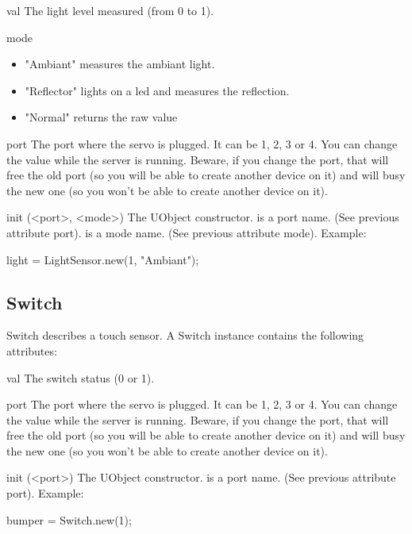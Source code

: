 \begin{urbiscriptapi}

\item[val]
The light level measured (from 0 to 1).

\item[mode]
  \begin{itemize}
  \item "Ambiant" measures the ambiant light.
  \item "Reflector" lights on a led and measures the reflection.
  \item "Normal" returns the raw value
  \end{itemize}

\item[port] The port where the servo is plugged. It can be 1, 2, 3 or 4. You
  can change the value while the server is running. Beware, if you change
  the port, that will free the old port (so you will be able to create
  another device on it) and will busy the new one (so you won't be able to
  create another device on it).

\item[init](<port>, <mode>) The UObject constructor.  is a port
  name. (See previous attribute port).  is a mode name. (See
  previous attribute mode). Example:
\begin{urbiunchecked}
  light = LightSensor.new(1, "Ambiant");
\end{urbiunchecked}
\end{urbiscriptapi}

\subsection{Switch}
Switch describes a touch sensor. A Switch instance contains the following
attributes:

\begin{urbiscriptapi}
\item[val] The switch status (0 or 1).

\item[port] The port where the servo is plugged. It can be 1, 2, 3 or 4. You
  can change the value while the server is running. Beware, if you change
  the port, that will free the old port (so you will be able to create
  another device on it) and will busy the new one (so you won't be able to
  create another device on it).

\item[init](<port>) The UObject constructor.  is a port name. (See
  previous attribute port). Example:
\begin{urbiunchecked}
  bumper = Switch.new(1);
\end{urbiunchecked}

\end{urbiscriptapi}

